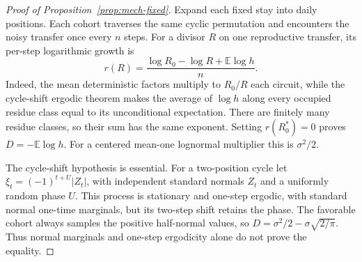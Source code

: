 \begin{proof}[Proof of Proposition~\ref{prop:mech-fixed}]
Expand each fixed stay into daily positions. Each cohort traverses the same cyclic permutation and encounters the noisy transfer once every \(n\) steps. For a divisor \(R\) on one reproductive transfer, its per-step logarithmic growth is
\[
 r(R)=\frac{\log R_0-\log R+\mathbb E\log h}{n}.
\]
Indeed, the mean deterministic factors multiply to \(R_0/R\) each circuit, while the cycle-shift ergodic theorem makes the average of \(\log h\) along every occupied residue class equal to its unconditional expectation. There are finitely many residue classes, so their sum has the same exponent. Setting \(r(R_0^*)=0\) proves \(D=-\mathbb E\log h\). For a centered mean-one lognormal multiplier this is \(\sigma^2/2\).

The cycle-shift hypothesis is essential. For a two-position cycle let \(\xi_t=(-1)^{t+U}|Z_t|\), with independent standard normals \(Z_t\) and a uniformly random phase \(U\). This process is stationary and one-step ergodic, with standard normal one-time marginals, but its two-step shift retains the phase. The favorable cohort always samples the positive half-normal values, so \(D=\sigma^2/2-\sigma\sqrt{2/\pi}\). Thus normal marginals and one-step ergodicity alone do not prove the equality.
\end{proof}

